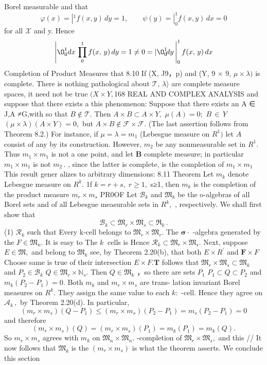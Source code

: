 Borel measurable and that $$ \varphi(x)=\left|^{1}f(x,y)\,d y=1,\qquad\psi(y)=\right|_{0}^{1}f(x,y)\,d x=0 $$ for all $\scriptstyle{\mathcal{X}}$ and y. Hence $$ \left|\O_{0}^{1}d x\,\prod_{0}^{1}f(x,\,y)\,d y=1\neq0= |\O_{0}^{1}\!d y\,\right|_{0}^{1}f(x,\,y)\,d x $$ Completion of Product Measures that 8.10 If (X, J9，p) and (Y, 9 × 9, $\mu\times\lambda\mathbf{)}$ is complete. There is nothing pathological about ${\mathcal{T}},\,\lambda\rangle$ are complete measure spaces, it need not be true $(X\times Y,$168 REAL AND COMPLEX ANALYSIS and suppose that there exists a this phenomenon: Suppose that there exists an A ∈ J,A ≠G,with so that $B\notin{\mathcal{T}}.$ Then $A\times B\subset A\times Y,$ $\mu(A)=0;$ $\scriptstyle{B\,\in\,Y}$ $(\mu\times\lambda)(A\times Y)=0,$ but $A\times B\not\in{\mathcal{F}}\times{\mathcal{F}}.$ (The last assertion follows from Theorem 8.2.) For instance, if $\mu=\lambda=m_{1}$ (Lebesgue measure on $R^{1})$ let $\scriptstyle A$ consist of any by its construction. However, $m_{2}$ be any nonmeasurable set in $R^{1}.$ Thus $m_{1}\times m_{1}$ is not a one point, and let $\boldsymbol{B}$ complete measure; in particular $m_{1}\times m_{1}$ is not $m_{2}\,.$ , since the latter is complete, is the completion of $m_{1}\times m_{1}$ This result gener alizes to arbitrary dimensions: 8.11 Theorem Let $m_{k}$ denote Lebesgue measure on $R^{k}.$ 1f $k=r+s,\;r\geq1,$ s≥1, then $m_{k}$ is the completion of the product measure $m_{r}\times m_{s}$ PR0OF Let ${\mathcal{B}}_{k}$ and ${\mathfrak{M}}_{k}$ be the o-algebras of all Borel sets and of all Lebesgue measurable sets in $R^{k},$ , respectively. We shall first show that $$ \mathcal{B}_{k}\subset\mathfrak{M}_{r}\times\mathfrak{M}_{s}\subset\Re_{k}\,. $$ (1) ${\mathcal{R}}_{k}$ such that Every k-cell belongs to ${\mathfrak{M}}_{r}\times{\mathfrak{M}}_{r}.$ The ${\boldsymbol{\sigma}}\cdot$ -algebra generated by the $F\in\mathfrak{M}_{n}.$ It is easy to The $k{\mathrm{~}}$ cells is Hence ${\mathcal{R}}_{k}\subset{\mathfrak{M}}_{r}\times{\mathfrak{M}}_{s}.$ Next, suppose $E\in{\mathfrak{M}},$ and belong to ${\mathfrak{M}}_{k}$ see, by Theorem 2.20(b), that both $\scriptstyle{E\times R^{\prime}}$ and $\scriptstyle\mathbf{F}\times F$ Choose same is true of their intersection $E\times F.\mathbf{T}$ follows that ${\mathfrak{M}}_{r}\times{\mathfrak{M}}_{s}\subset{\mathfrak{M}}_{k}$ and $P_{2}\in{\mathcal{B}}_{k}$ $Q\in\mathfrak{M}_{r}\times\mathbb{N}_{s}.$ Then $Q\in{\mathfrak{M}}_{k}$ ，so there are sets $P_{1}$ $P_{1}\subset Q\subset P_{2}$ and $m_{k}(P_{2}-P_{1})=0.$ Both $m_{k}$ and $m_{r}\times m_{s}$ are trans- lation invariant Borel measures on $R^{k}.$ They assign the same value to each $k{\mathrm{:}}$ -cell. Hence they agree on ${\mathcal{A}}_{k}\,,$ by Theorem 2.20(d). In particular, $$ (m_{r}\times m_{s})(Q-P_{1})\leq(m_{r}\times m_{s})(P_{2}-P_{1})=m_{s}(P_{2}-P_{1})=0 $$ and therefore $$ (m_{r}\times m_{s})(Q)=(m_{r}\times m_{s})(P_{1})=m_{k}(P_{1})=m_{k}(Q). $$ So $m_{r}\times m_{s}$ agrees with $m_{k}$ on ${\mathfrak{M}}_{n}\times{\mathfrak{M}}_{n}.$ -completion of ${\mathfrak{M}}_{r}\times{\mathfrak{M}}_{s},$ and this // It now follows that ${\mathfrak{M}}_{k}$ is the $(m_{r}\times m_{s})$ is what the theorem asserts. We conclude this section 